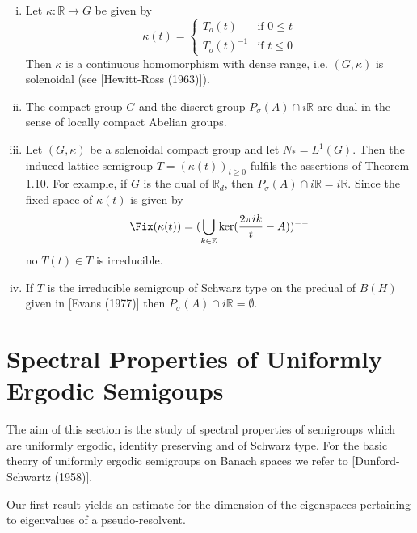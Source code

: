 \begin{remark}\label{rem:d3-1-13}
\begin{enumerate}[(i), wide]
\item Let $\kappa:\mathbb{R} \to G$ be given by
\[
\kappa(t) = \begin{cases}
T_{o}(t) & \text{if } 0 \leq t \\
T_{o}(t)^{-1} & \text{if } t \leq 0
\end{cases}
\]
Then $\kappa$ is a continuous homomorphism with dense range, i.e. $(G,\kappa)$ is solenoidal (see [Hewitt-Ross (1963)]).

\item The compact group $G$ and the discret group $P_{\sigma}(A) \cap i\mathbb{R}$ are dual in the sense of locally compact Abelian groups.

\item Let $(G,\kappa)$ be a solenoidal compact group and let $N_{*} = L^{1}(G)$.
Then the induced lattice semigroup $T = (\kappa(t))_{t \geq 0}$ fulfils the assertions of Theorem 1.10.
For example, if $G$ is the dual of $\mathbb{R}_{d}$, then $P_{\sigma}(A) \cap i\mathbb{R} = i\mathbb{R}$.
Since the fixed space of $\kappa(t)$ is given by
\[
\Fix(\kappa(t)) = (\bigcup_{k \in \mathbb{Z}} \ker(\frac{2\pi ik}{t} - A))^{--}
\]
no $T(t) \in T$ is irreducible.

\item If $T$ is the irreducible semigroup of Schwarz type on the predual of $B(H)$ given in [Evans (1977)] then $P_{\sigma}(A) \cap i\mathbb{R} = \emptyset$.
\end{enumerate}
\end{remark}

\section{Spectral Properties of Uniformly Ergodic Semigoups}\label{sec:d3-2}

The aim of this section is the study of spectral properties of semigroups which are uniformly ergodic, identity preserving and of Schwarz type.
For the basic theory of uniformly ergodic semigroups on Banach spaces we refer to [Dunford-Schwartz (1958)].






Our first result yields an estimate for the dimension of the eigenspaces pertaining to eigenvalues of a pseudo-resolvent.

